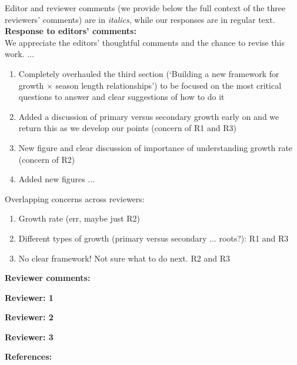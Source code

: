 \documentclass[11pt]{article}
\begin{document}
\setlength{\parindent}{0cm}
\setlength{\parskip}{7pt}


\renewcommand{\refname}{\CHead{}}

Editor and reviewer comments (we provide below the full context of the three reviewers' comments) are in \emph{italics}, while our responses are in regular text. \\ 

{\bf Response to editors' comments:} \\  %

We appreciate the editors' thoughtful comments and the chance to revise this work. ...

\begin{enumerate}
\item Completely overhauled the third section (`Building a new framework for growth × season length relationships') to be focused on the most critical questions to answer and clear suggestions of how to do it
\item Added a discussion of primary versus secondary growth early on and we return this as we develop our points  (concern of R1 and R3) 
\item New figure and clear discussion of importance of understanding growth rate (concern of R2) 
\item Added new figures ... 
\end{enumerate}

Overlapping concerns across reviewers:
\begin{enumerate}
\item Growth rate (err, maybe just R2) 
\item Different types of growth (primary versus secondary ... roots?):  R1 and R3
\item No clear framework! Not sure what to do next. R2 and R3 
\end{enumerate}

{\bf Reviewer comments:} 

{\bf Reviewer: 1}


{\bf Reviewer: 2}


{\bf Reviewer: 3}



\newpage
{\bf References:}

\end{document}
